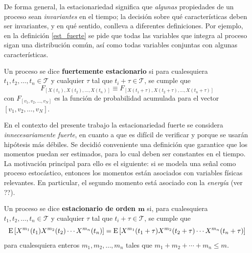 De forma general, la estacionariedad significa que \textit{algunas} propiedades de un proceso sean \textit{invariantes} en el tiempo; la decisión sobre qué características deben ser invariantes, y en qué sentido, conlleva a diferentes definiciones.
%
Por ejemplo, en la definición \ref{est_fuerte} se pide que todas las variables que integra al proceso sigan una distribución común, así como todas variables conjuntas con algunas características.


\begin{definicion}%
Un proceso \xt se dice \textbf{fuertemente estacionario} si para cualesquiera $t_1, t_2, \dots, t_n \in \mathcal{T}$ y cualquier $\tau$ tal que $t_i + \tau \in \mathcal{T}$, se cumple que
\begin{equation*}
F_{\left[ X(t_1), X(t_2), \dots, X(t_n) \right]} \equiv
F_{\left[ X(t_1 + \tau), X(t_2 + \tau), \dots, X(t_n + \tau) \right]}
\end{equation*}
con $F_{[v_1,v_2,\dots,v_N]}$ es la función de probabilidad acumulada para el vector $[v_1,v_2,\dots,v_N]$.
\label{est_fuerte}
\end{definicion}

En el contexto del presente trabajo la estacionariedad fuerte se considera \textit{innecesariamente fuerte}, en cuanto a que es difícil de verificar y porque se usarán hipótesis más débiles.
%
Se decidió conveniente una definición que garantice que los momentos puedan ser estimados, para lo cual deben ser constantes en el tiempo.
%
La motivación principal para ello es el siguiente: si se modela una señal como proceso estocástico, entonces los momentos están asociados con variables físicas relevantes. 
%
En particular, el segundo momento está asociado con la \textit{energía} (ver ??).

\begin{definicion}%
Un proceso \xt se dice \textbf{estacionario de orden $\boldsymbol{m}$} si, para cualesquiera $t_1, t_2, \dots, t_n \in \mathcal{T}$ y cualquier $\tau$ tal que $t_i + \tau \in \mathcal{T}$, se cumple que
\begin{equation*}
\mathrm{E}\left[ X^{m_1}(t_1)X^{m_2}(t_2)\cdots X^{m_n}(t_n) \right] =
\mathrm{E}\left[ X^{m_1}(t_1+\tau)X^{m_2}(t_2+\tau)\cdots X^{m_n}(t_n+\tau) \right]
\end{equation*}
para cualesquiera enteros $m_1, m_2, \dots, m_n$ tales que $m_1+m_2+\cdots+m_n \leq m$.
\label{est_m}
\end{definicion}

